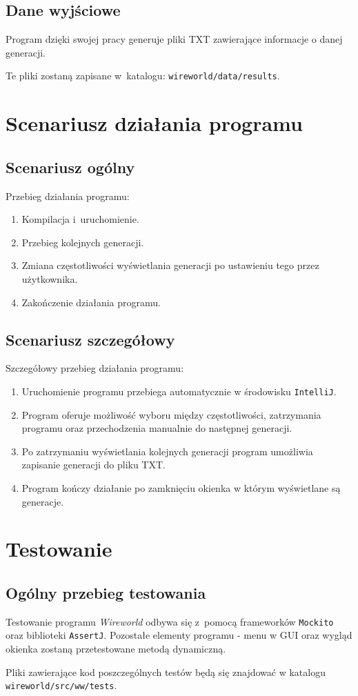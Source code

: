 \documentclass[a4paper,12pt,oneside]{article}
\begin{document}
\subsection{Dane wyjściowe}

Program dzięki swojej pracy generuje pliki TXT zawierające informacje o danej generacji.
\par Te pliki zostaną zapisane w~katalogu: \verb+wireworld/data/results+.

\section{Scenariusz działania programu}
\subsection{Scenariusz ogólny}
Przebieg działania programu:
\begin{enumerate}
\item Kompilacja i~uruchomienie.
\item Przebieg kolejnych generacji.
\item Zmiana częstotliwości wyświetlania generacji po ustawieniu tego przez użytkownika.
\item Zakończenie działania programu.
\end{enumerate}
\subsection{Scenariusz szczegółowy}
Szczegółowy przebieg działania programu:
\begin{enumerate}
\item Uruchomienie programu przebiega automatycznie w środowisku \verb+IntelliJ+.
\item Program oferuje możliwość wyboru między częstotliwości, zatrzymania programu oraz przechodzenia manualnie do następnej generacji.
\item Po zatrzymaniu wyświetlania kolejnych generacji program umożliwia zapisanie generacji do pliku TXT.
\item Program kończy działanie po zamknięciu okienka w którym wyświetlane są generacje.
\end{enumerate}

\section{Testowanie}

\subsection{Ogólny przebieg testowania}

Testowanie programu \textit{Wireworld} odbywa się z~pomocą frameworków \verb+Mockito+ oraz biblioteki \verb+AssertJ+. Pozostałe elementy programu - menu w GUI oraz wygląd okienka zostaną przetestowane metodą dynamiczną.

\par Pliki zawierające kod poszczególnych testów będą się znajdować w katalogu \verb+wireworld/src/ww/tests+.
\end{document}
